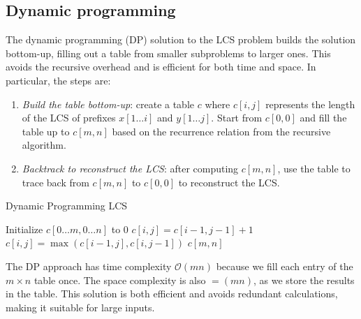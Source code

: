 \subsection{Dynamic programming}
The dynamic programming (DP) solution to the LCS problem builds the solution bottom-up, filling out a table from smaller subproblems to larger ones. 
This avoids the recursive overhead and is efficient for both time and space.
In particular, the steps are: 
\begin{enumerate}
    \item \textit{Build the table bottom-up}: create a table $c$ where $c[i,j]$ represents the length of the LCS of prefixes $x[1\dots i]$ and $y[1\dots j]$. 
        Start from $c[0,0]$ and fill the table up to $c[m,n]$ based on the recurrence relation from the recursive algorithm.
    \item \textit{Backtrack to reconstruct the LCS}: after computing $c[m,n]$, use the table to trace back from $c[m,n]$ to $c[0,0]$ to reconstruct the LCS.
\end{enumerate}
\begin{algorithm}[H] 
    \caption{Dynamic Programming LCS} 
    \begin{algorithmic} 
            \State Initialize $c[0\dots m,0\dots n]$ to 0 
                        \State $c[i, j] = c[i-1, j-1] + 1$ 
                    \Else 
                        \State $c[i, j] = \max(c[i-1, j], c[i, j-1])$ 
                    \EndIf 
                \EndFor 
            \EndFor 
            \State \Return $c[m, n]$ 
        \EndProcedure 
    \end{algorithmic} 
\end{algorithm}
The DP approach has time complexity $\mathcal{O}(mn)$ because we fill each entry of the $m\times n$ table once. 
The space complexity is also $\mathcal{=}(mn)$, as we store the results in the table. 
This solution is both efficient and avoids redundant calculations, making it suitable for large inputs.